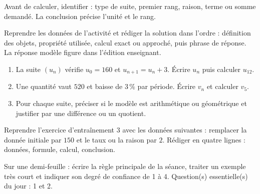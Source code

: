 \begin{traceecrite}Avant de calculer, identifier : type de suite, premier rang, raison, terme ou somme demandé. La conclusion précise l'unité et le rang.\end{traceecrite}

\begin{exemple}
Reprendre les données de l'activité et rédiger la solution dans l'ordre : définition des objets, propriété utilisée, calcul exact ou approché, puis phrase de réponse. La réponse modèle figure dans l'édition enseignant.
\end{exemple}

\begin{exercice}[-- essentiel]
\begin{enumerate}\item La suite $(u_n)$ vérifie $u_0=160$ et $u_{n+1}=u_n+3$. Écrire $u_n$ puis calculer $u_{12}$.\item Une quantité vaut $520$ et baisse de $3\,\%$ par période. Écrire $v_n$ et calculer $v_5$.\item Pour chaque suite, préciser si le modèle est arithmétique ou géométrique et justifier par une différence ou un quotient.\end{enumerate}
\end{exercice}


\begin{dm}Reprendre l'exercice d'entraînement 3 avec les données suivantes : remplacer la donnée initiale par $150$ et le taux ou la raison par $2$. Rédiger en quatre lignes : données, formule, calcul, conclusion.\end{dm}

\begin{sortie}Sur une demi-feuille : écrire la règle principale de la séance, traiter un exemple très court et indiquer son degré de confiance de 1 à 4. Question(s) essentielle(s) du jour : 1 et 2.\end{sortie}


